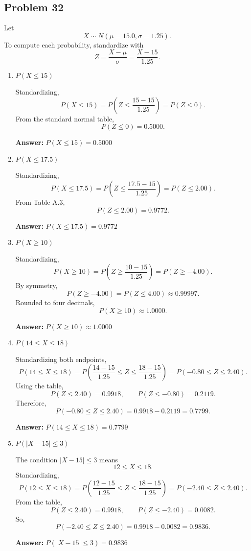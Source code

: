 \documentclass[11pt]{article}
\begin{document}
\subsection*{Problem 32}

Let
\[
X \sim N(\mu=15.0,\sigma=1.25).
\]
To compute each probability, standardize with
\[
Z=\frac{X-\mu}{\sigma}=\frac{X-15}{1.25}.
\]

\begin{enumerate}
    \item[(a)] \textbf{$P(X\le 15)$}

    Standardizing,
    \[
    P(X\le 15)=P\left(Z\le \frac{15-15}{1.25}\right)=P(Z\le 0).
    \]
    From the standard normal table,
    \[
    P(Z\le 0)=0.5000.
    \]

    \textbf{Answer:} $P(X\le 15)=0.5000$

    \item[(b)] \textbf{$P(X\le 17.5)$}

    Standardizing,
    \[
    P(X\le 17.5)=P\left(Z\le \frac{17.5-15}{1.25}\right)=P(Z\le 2.00).
    \]
    From Table A.3,
    \[
    P(Z\le 2.00)=0.9772.
    \]

    \textbf{Answer:} $P(X\le 17.5)=0.9772$

    \item[(c)] \textbf{$P(X\ge 10)$}

    Standardizing,
    \[
    P(X\ge 10)=P\left(Z\ge \frac{10-15}{1.25}\right)=P(Z\ge -4.00).
    \]
    By symmetry,
    \[
    P(Z\ge -4.00)=P(Z\le 4.00)\approx 0.99997.
    \]
    Rounded to four decimals,
    \[
    P(X\ge 10)\approx 1.0000.
    \]

    \textbf{Answer:} $P(X\ge 10)\approx 1.0000$

    \item[(d)] \textbf{$P(14\le X\le 18)$}

    Standardizing both endpoints,
    \[
    P(14\le X\le 18)=P\left(\frac{14-15}{1.25}\le Z\le \frac{18-15}{1.25}\right)
    =P(-0.80\le Z\le 2.40).
    \]
    Using the table,
    \[
    P(Z\le 2.40)=0.9918,\qquad P(Z\le -0.80)=0.2119.
    \]
    Therefore,
    \[
    P(-0.80\le Z\le 2.40)=0.9918-0.2119=0.7799.
    \]

    \textbf{Answer:} $P(14\le X\le 18)=0.7799$

    \item[(e)] \textbf{$P(|X-15|\le 3)$}

    The condition $|X-15|\le 3$ means
    \[
    12\le X\le 18.
    \]
    Standardizing,
    \[
    P(12\le X\le 18)=P\left(\frac{12-15}{1.25}\le Z\le \frac{18-15}{1.25}\right)
    =P(-2.40\le Z\le 2.40).
    \]
    From the table,
    \[
    P(Z\le 2.40)=0.9918,\qquad P(Z\le -2.40)=0.0082.
    \]
    So,
    \[
    P(-2.40\le Z\le 2.40)=0.9918-0.0082=0.9836.
    \]

    \textbf{Answer:} $P(|X-15|\le 3)=0.9836$
\end{enumerate}
\end{document}
